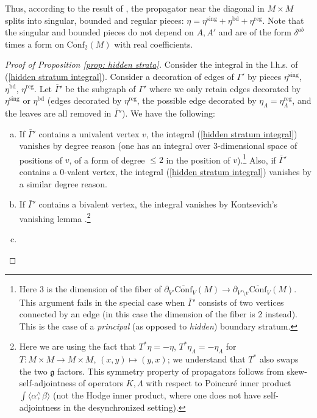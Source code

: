 \documentclass[11pt,a4paper]{amsart}
\theoremstyle{plain} %
\theoremstyle{definition}
\theoremstyle{remark}
\newcommand{\g}{\mathfrak{g}}
\newcommand{\mr}{\mathrm}
\newcommand{\ra}{\rightarrow}
\begin{document}
Thus, according to the result of \cite[PL5]{Axelrod1991}, the propagator near the diagonal in $M\times M$ splits into singular, bounded and regular pieces:
$\eta=\eta^\mr{sing}+\eta^\mr{bd}+\eta^\mr{reg}$. Note that the singular and bounded pieces do not depend on $A,A'$ and are of the form $\delta^{ab}$ times a form on $\overline{\mr{Conf}}_2(M)$ with real coefficients.
\begin{proof}[Proof of Proposition \ref{prop: hidden strata}]
    Consider the integral in the l.h.s. of (\ref{hidden stratum integral}). Consider a decoration of edges of $\Gamma'$ by pieces $\eta^\mr{sing}$, $\eta^\mr{bd}$, $\eta^\mr{reg}$. Let $\overline{\Gamma}'$ be the subgraph of $\Gamma'$ where we only retain edges decorated by $\eta^\mr{sing}$ or $\eta^\mr{bd}$  (edges decorated by $\eta^\mr{reg}$, the possible edge decorated by $\eta_\Lambda=\eta_\Lambda^\mr{reg}$, and the leaves are all removed in $\overline\Gamma'$). We have the following:
    \begin{enumerate}[(a)]
        \item If $\bar\Gamma'$ contains a univalent vertex $v$, the integral (\ref{hidden stratum integral}) vanishes by degree reason (one has an integral over 3-dimensional space of positions of $v$, of a form of degree $\leq 2$ in the position of $v$).\footnote{Here 3 is the dimension of the fiber of $\partial_{V'}\overline{\mr{Conf}}_V(M)\ra \partial_{V'\setminus v}\overline{\mr{Conf}}_V(M)$. This argument fails in the special case when $\bar\Gamma'$ consists of two vertices connected by an edge (in this case the dimension of the fiber is 2 instead). This is the case of a \emph{principal} (as opposed to \emph{hidden}) boundary stratum.}
        Also, if $\bar\Gamma'$ contains a 0-valent vertex, the integral (\ref{hidden stratum integral}) vanishes by a similar degree reason.
        \item If $\bar\Gamma'$ contains a bivalent vertex, the integral vanishes by Kontsevich's vanishing lemma \cite[Lemma 2.2]{Kontsevich1994}.\footnote{Here we are using the fact that $T^*\eta=-\eta$, $T^*\eta_\Lambda=-\eta_\Lambda$ for $T\colon M\times M\ra M\times M$, $(x,y)\mapsto (y,x)$; we understand that $T^*$ also swaps the two $\g$ factors. This symmetry property of propagators follows from skew-self-adjointness of operators $K,\Lambda$ with respect to Poincar\'e inner product $\int \langle \alpha \stackrel{\wedge}{,} \beta \rangle$ (not the Hodge inner product, where one does not have self-adjointness in the desynchronized setting).
        }
        \item %

\end{enumerate}
\end{proof}
\end{document}
